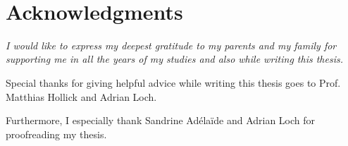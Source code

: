 



\bigskip
\ \\[5cm]
\begingroup
\let\clearpage\relax
\let\cleardoublepage\relax
\let\cleardoublepage\relax
\centering
\begin{minipage}[h]{7cm}
\chapter*{Acknowledgments}
\centering
{\slshape 
I would like to express my deepest gratitude to my parents and my family for supporting me in all the years of my studies and also while writing this thesis.

\bigskip

Special thanks for giving helpful advice while writing this thesis goes to Prof. Matthias Hollick and Adrian Loch.

\bigskip

Furthermore, I especially thank Sandrine Adéla\"ide and Adrian Loch for proofreading my thesis.
}
\end{minipage}

\endgroup


